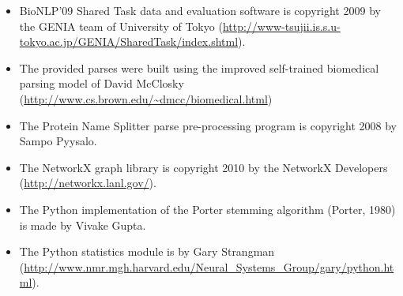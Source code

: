 \documentclass[a4paper,12pt]{article}
\begin{document}
\begin{itemize}
\item BioNLP'09 Shared Task data and evaluation software is copyright 2009 by
the GENIA team of University of Tokyo 
(\url{http://www-tsujii.is.s.u-tokyo.ac.jp/GENIA/SharedTask/index.shtml}).
\item The provided parses were built using the improved self-trained biomedical
parsing model of David McClosky
(\url{http://www.cs.brown.edu/~dmcc/biomedical.html})
\item The Protein Name Splitter parse pre-processing program is copyright
2008 by Sampo Pyysalo.
\item The NetworkX graph library is copyright 2010 by the NetworkX Developers
(\url{http://networkx.lanl.gov/}).
\item The Python implementation of the Porter stemming algorithm (Porter, 1980)
is made by Vivake Gupta.
\item The Python statistics module is by Gary Strangman
(\url{http://www.nmr.mgh.harvard.edu/Neural_Systems_Group/gary/python.html}).
\end{itemize}
\end{document}
